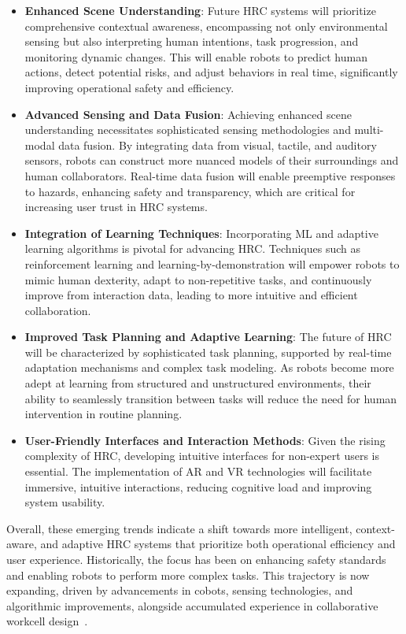 \begin{itemize}
    \item \textbf{Enhanced Scene Understanding}: Future \ac{HRC} systems will prioritize comprehensive contextual awareness, encompassing not only environmental sensing but also interpreting human intentions, task progression, and monitoring dynamic changes. This will enable robots to predict human actions, detect potential risks, and adjust behaviors in real time, significantly improving operational safety and efficiency.

    \item \textbf{Advanced Sensing and Data Fusion}: Achieving enhanced scene understanding necessitates sophisticated sensing methodologies and multi-modal data fusion. By integrating data from visual, tactile, and auditory sensors, robots can construct more nuanced models of their surroundings and human collaborators. Real-time data fusion will enable preemptive responses to hazards, enhancing safety and transparency, which are critical for increasing user trust in \ac{HRC} systems.

    \item \textbf{Integration of Learning Techniques}: Incorporating \ac{ML} and adaptive learning algorithms is pivotal for advancing \ac{HRC}. Techniques such as reinforcement learning and learning-by-demonstration will empower robots to mimic human dexterity, adapt to non-repetitive tasks, and continuously improve from interaction data, leading to more intuitive and efficient collaboration.

    \item \textbf{Improved Task Planning and Adaptive Learning}: The future of \ac{HRC} will be characterized by sophisticated task planning, supported by real-time adaptation mechanisms and complex task modeling. As robots become more adept at learning from structured and unstructured environments, their ability to seamlessly transition between tasks will reduce the need for human intervention in routine planning.

    \item \textbf{User-Friendly Interfaces and Interaction Methods}: Given the rising complexity of \ac{HRC}, developing intuitive interfaces for non-expert users is essential. The implementation of \ac{AR} and \ac{VR} technologies will facilitate immersive, intuitive interactions, reducing cognitive load and improving system usability.
\end{itemize}

Overall, these emerging trends indicate a shift towards more intelligent, context-aware, and adaptive \ac{HRC} systems that prioritize both operational efficiency and user experience. Historically, the focus has been on enhancing safety standards and enabling robots to perform more complex tasks. This trajectory is now expanding, driven by advancements in cobots, sensing technologies, and algorithmic improvements, alongside accumulated experience in collaborative workcell design~\cite{robotics8040100}.


